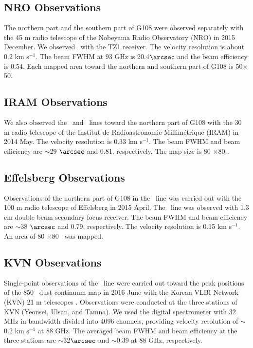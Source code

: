 \documentclass[manuscript]{aastex}
\begin{document}
\subsection{NRO Observations}
The northern part and the southern part of G108 were observed separately with the 45 m radio telescope of the Nobeyama Radio Observatory (NRO) in 2015 December.
We observed \nhp\ with the TZ1 receiver.
The velocity resolution is about 0.2 km s$^{-1}$.
The beam FWHM at 93 GHz is 20.4$\arcsec$ and the beam efficiency is 0.54.
Each mapped area toward the northern and southern part of G108 is 50\arcsec$\times$50\arcsec.

\subsection{IRAM Observations}
We also observed the \hcop\ and \hcn\ lines toward the northern part of G108 with the 30 m radio telescope of the Institut de Radioastronomie Millim\'{e}trique (IRAM) in 2014 May.
The velocity resolution is 0.33 km s$^{-1}$.
The beam FWHM and beam efficiency are $\sim$29 $\arcsec$ and 0.81, respectively.
The map size is 80 \arcsec$\times$80 \arcsec.

\subsection{Effelsberg Observations}
Observations of the northern part of G108 in the \nht\ line was carried out with the 100 m radio telescope of Effelsberg in 2015 April.
The \nht\ line was observed with 1.3 cm double beam secondary focus receiver.
The beam FWHM and beam efficiency are $\sim$38 $\arcsec$ and 0.79, respectively.
The velocity resolution is 0.15 km s$^{-1}$.
An area of 80 \arcsec$\times$80 \arcsec\ was mapped.

\subsection{KVN Observations}
Single-point observations of the \hcn\ line were carried out toward the peak positions of the 850 \m\ dust continuum map in 2016 June with the Korean VLBI Network (KVN) 21 m telescopes \citep{kim11}.
Observations were conducted at the three stations of KVN (Yeonsei, Ulsan, and Tamna).
We used the digital spectrometer with 32 MHz in bandwidth divided into 4096 channels, providing velocity resolution of $\sim$0.2 km s$^{-1}$ at 88 GHz.
The averaged beam FWHM and beam efficiency at the three stations are $\sim$32$\arcsec$ and $\sim$0.39 at 88 GHz, respectively.
\end{document}
